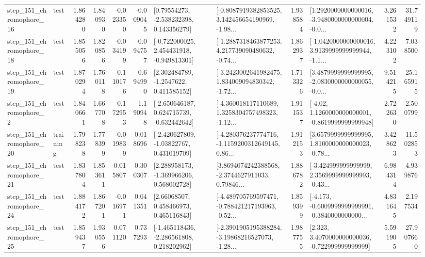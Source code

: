 \begin{tabular}{llrrrrllrlrr}
  step\_151\_chromophore\_16 &      test &      1.864280 &    1.840930 &     -0.023350 & -0.009045 &     [0.79554273, -2.538232398, 0.143356279] &  [-0.8087919382853525, 3.142456654190969, -1.98... &       1.938584 &  [1.2920000000000016, -3.9480000000000004, -0.0... &            3.261532 &         31.749119 \\
  step\_151\_chromophore\_18 &      test &      1.855056 &    1.820856 &     -0.034199 & -0.094757 &   [-0.722000025, 2.454431918, -0.949813301] &  [-1.2887318463877253, 4.217739090480632, -0.74... &       1.862937 &  [-1.0420000000000016, 3.9139999999999944, -1.1... &            4.223102 &          7.038500 \\
  step\_151\_chromophore\_19 &      test &      1.870294 &    1.760118 &     -0.110176 & -0.694990 &      [2.302484789, -1.2547622, 0.411585152] &  [-3.2423002641982475, 1.834009094830342, -1.72... &       1.713326 &  [3.4879999999999995, -2.0830000000000055, -0.0... &            9.514215 &         25.165915 \\
   step\_151\_chromophore\_2 &      test &      1.840661 &    1.667708 &     -0.172953 & -1.190948 &   [-2.650646187, 0.624715739, -0.632442642] &  [-4.360018117110689, 1.3258304757498323, -1.12... &       1.911537 &   [-4.02, 1.1260000000000001, -0.8619999999999948] &            2.722630 &          2.500799 \\
  step\_151\_chromophore\_20 &  training &      1.798238 &    1.778399 &     -0.019839 &  0.018696 &    [-2.420627809, -1.03822767, 0.431019709] &  [-4.280376237774716, -1.1159200312649145, 0.86... &       1.912153 &  [3.6579999999999995, 1.8100000000000023, -0.78... &            3.428623 &         11.502853 \\
  step\_151\_chromophore\_21 &      test &      1.837804 &    1.853611 &      0.015807 &  0.300307 &    [2.288958173, -1.369966206, 0.568002728] &  [3.8694074242388568, -2.3744627911033, 0.79846... &       1.886782 &  [-3.424999999999999, 2.3569999999999993, -0.43... &            6.984314 &          4.939876 \\
  step\_151\_chromophore\_24 &      test &      1.884172 &    1.867201 &     -0.016971 &  0.041351 &      [2.66068507, 0.458466973, 0.465116843] &  [-4.489705769597471, -0.788421217193963, -0.52... &       1.859399 &  [-4.173, -0.6009999999999991, -0.3840000000000... &            4.831645 &          2.197534 \\
  step\_151\_chromophore\_25 &      test &      1.859437 &    1.930556 &      0.071120 &  0.737293 &   [-1.465118436, -2.286561808, 0.218202962] &  [-2.3901905195388284, -3.19868216527073, -1.28... &       1.987755 &    [2.323, 3.4070000000000036, -0.722999999999999] &            5.591905 &         27.907660 \\

\end{tabular}
